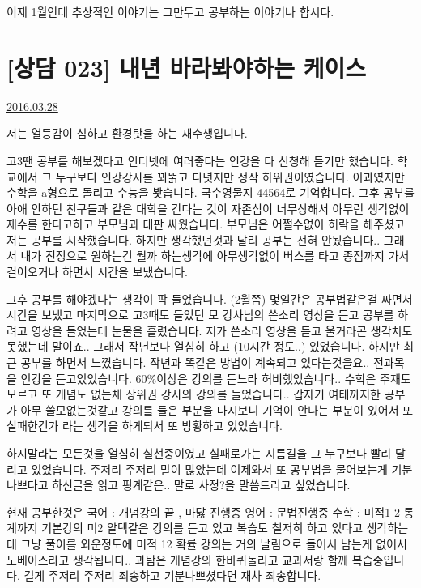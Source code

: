 이제 1월인데 추상적인 이야기는 그만두고 공부하는 이야기나 합시다.
\vspace{5mm}




\section{[상담 023] 내년 바라봐야하는 케이스}
\href{https://www.kockoc.com/Apoc/699642}{2016.03.28}

\vspace{5mm}

저는 열등감이 심하고 환경탓을 하는 재수생입니다.
\vspace{5mm}

고3땐 공부를 해보겠다고 인터넷에 여러좋다는 인강을 다 신청해 듣기만 했습니다. 학교에서 그 누구보다 인강강사를 꾀뚥고 다녓지만 정작 하위권이였습니다. 이과였지만 수학을 a형으로 돌리고 수능을 봣습니다. 국수영물지 44564로 기억합니다. 그후 공부를 아애 안하던 친구들과 같은 대학을 간다는 것이 자존심이 너무상해서 아무런 생각없이 재수를 한다고하고 부모님과 대판 싸웠습니다. 부모님은 어쩔수없이 허락을 해주셨고 저는 공부를 시작했습니다. 하지만 생각했던것과 달리 공부는 전혀 안됬습니다.. 그래서 내가 진정으로 원하는건 뭘까 하는생각에 아무생각없이 버스를 타고 종점까지 가서 걸어오거나 하면서 시간을 보냈습니다.
\vspace{5mm}

그후 공부를 해야겠다는 생각이 팍 들었습니다. (2월쯤) 몇일간은 공부법같은걸 짜면서 시간을 보냈고 마지막으로 고3때도 들었던 모 강사님의 쓴소리 영상을 듣고 공부를 하려고 영상을 들었는데 눈물을 흘렸습니다. 저가 쓴소리 영상을 듣고 울거라곤 생각치도 못했는데 말이죠.. 그래서 작년보다 열심히 하고 (10시간 정도..) 있었습니다. 하지만 최근 공부를 하면서 느꼈습니다. 작년과 똑같은 방법이 계속되고 있다는것을요.. 전과목을 인강을 듣고있었습니다. 60$\%$이상은 강의를 듣느라 허비했었습니다.. 수학은 주재도모르고 또 개념도 없는채 상위권 강사의 강의를 들었습니다.. 갑자기 여태까지한 공부가 아무 쓸모없는것같고 강의를 들은 부분을 다시보니 기억이 안나는 부분이 있어서 또 실패한건가 라는 생각을 하게되서 또 방황하고 있었습니다.
\vspace{5mm}

하지말라는 모든것을 열심히 실천중이였고 실패로가는 지름길을 그 누구보다 빨리 달리고 있었습니다. 주저리 주저리 말이 많았는데 이제와서 또 공부법을 물어보는게 기분나쁘다고 하신글을 읽고 핑계같은.. 말로 사정?을 말씀드리고 싶었습니다.
\vspace{5mm}

현재 공부한것은 국어 : 개념강의 끝 , 마닳 진행중 영어 : 문법진행중 수학 : 미적1 2 통계까지 기본강의 미2 알텍같은 강의를 듣고 있고 복습도 철저히 하고 있다고 생각하는데 그냥 풀이를 외운정도에 미적 12 확률 강의는 거의 날림으로 들어서 남는게 없어서 노베이스라고 생각됩니다.. 과탐은 개념강의 한바퀴돌리고 교과서랑 함께 복습중입니다. 길게 주저리 주저리 죄송하고 기분나쁘셨다면 재차 죄송합니다.
\vspace{5mm}

